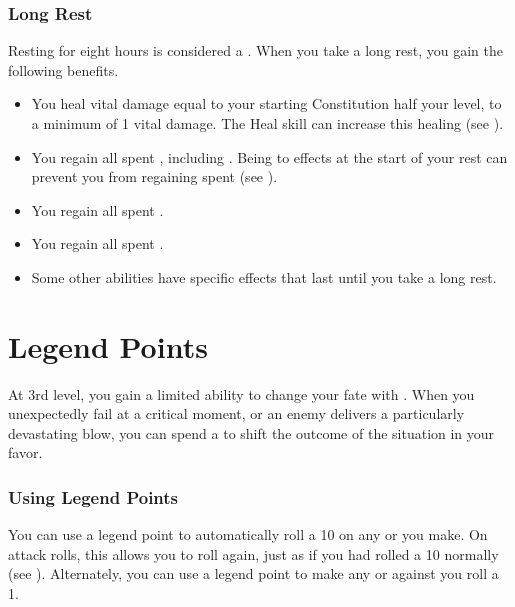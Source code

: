         \subsubsection{Long Rest}\label{Long Rest}
            Resting for eight hours is considered a .
            When you take a long rest, you gain the following benefits.
            \begin{itemize}
                \item You heal vital damage equal to your starting Constitution \add half your level, to a minimum of 1 vital damage.
                    The Heal skill can increase this healing (see ).
                \item You regain all spent , including .
                    Being  to effects at the start of your rest can prevent you from regaining spent  (see ).
                \item You regain all spent .
                \item You regain all spent .
                \item Some other abilities have specific effects that last until you take a long rest.
            \end{itemize}

\section{Legend Points}\label{Legend Points}
    At 3rd level, you gain a limited ability to change your fate with .
    When you unexpectedly fail at a critical moment, or an enemy delivers a particularly devastating blow, you can spend a  to shift the outcome of the situation in your favor.

    \subsubsection{Using Legend Points}
        You can use a legend point to automatically roll a 10 on any  or  you make.
        On attack rolls, this allows you to roll again, just as if you had rolled a 10 normally (see ).
        Alternately, you can use a legend point to make any  or  against you roll a 1.

